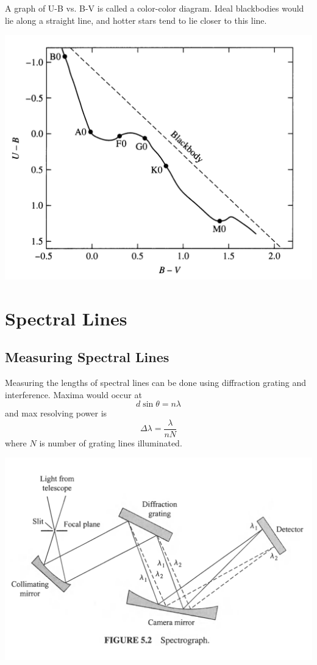\documentclass[12pt]{article}
\begin{document}
A graph of U-B vs. B-V is called a color-color diagram. Ideal blackbodies would lie along a straight line, and hotter stars tend to lie closer to this line.

\begin{center}
\includegraphics[scale=0.5]{Figures/ColorColorDiagram}
\end{center}

\section{Spectral Lines}

\subsection{Measuring Spectral Lines}

Measuring the lengths of spectral lines can be done using diffraction grating and interference. Maxima would occur at $$d\sin\theta = n\lambda$$ and max resolving power is $$\Delta\lambda = \frac{\lambda}{nN}$$ where $N$ is number of grating lines illuminated.

\begin{center}
\includegraphics[scale=0.5]{Figures/Spectrograph}
\end{center}
\end{document}
